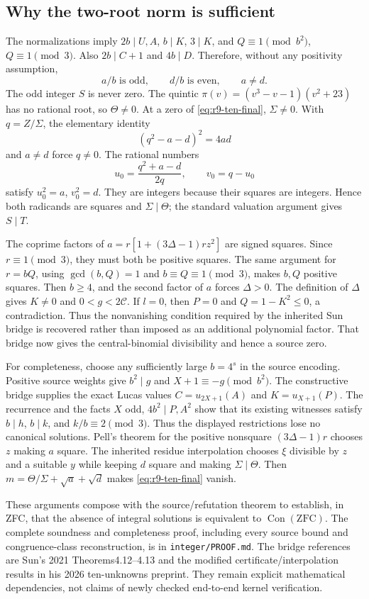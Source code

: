 \subsection{Why the two-root norm is sufficient}

The normalizations imply $2b\mid U,A$, $b\mid K$, $3\mid K$, and
$Q\equiv1\pmod{b^2}$, $Q\equiv1\pmod3$. Also $2b\mid C+1$ and
$4b\mid D$. Therefore, without any positivity assumption,
\[
 a/b\text{ is odd},\qquad d/b\text{ is even},\qquad a\ne d.
\]
The odd integer $S$ is never zero. The quintic
$\pi(v)=(v^3-v-1)(v^2+23)$ has no rational root, so $\Theta\ne0$.
At a zero of \eqref{eq:r9-ten-final}, $\Sigma\ne0$. With
$q=Z/\Sigma$, the elementary identity
\[
 (q^2-a-d)^2=4ad
\]
and $a\ne d$ force $q\ne0$. The rational numbers
\[
 u_0=\frac{q^2+a-d}{2q},\qquad v_0=q-u_0
\]
satisfy $u_0^2=a$, $v_0^2=d$. They are integers because their squares
are integers. Hence both radicands are squares and $\Sigma\mid\Theta$;
the standard valuation argument gives $S\mid T$.

The coprime factors of
$a=r[1+(3\Delta-1)rz^2]$ are signed squares. Since $r\equiv1\pmod3$,
they must both be positive squares. The same argument for $r=bQ$, using
$\gcd(b,Q)=1$ and $b\equiv Q\equiv1\pmod3$, makes $b,Q$ positive
squares. Then $b\ge4$, and the second factor of $a$ forces $\Delta>0$.
The definition of $\Delta$ gives $K\ne0$ and $0<g<2\mathcal C$.
If $l=0$, then $P=0$ and $Q=1-K^2\le0$, a contradiction. Thus the
nonvanishing condition required by the inherited Sun bridge is recovered
rather than imposed as an additional polynomial factor. That bridge now
gives the central-binomial divisibility and hence a source zero.

For completeness, choose any sufficiently large $b=4^s$ in the source
encoding. Positive source weights give $b^2\mid g$ and
$X+1\equiv-g\pmod{b^2}$. The constructive bridge supplies the exact
Lucas values $C=u_{2X+1}(A)$ and $K=u_{X+1}(P)$. The recurrence and the
facts $X$ odd, $4b^2\mid P,A^2$ show that its existing witnesses satisfy
$b\mid h$, $b\mid k$, and $k/b\equiv2\pmod3$. Thus the displayed
restrictions lose no canonical solutions. Pell's theorem for the positive
nonsquare $(3\Delta-1)r$ chooses $z$ making $a$ square. The inherited
residue interpolation chooses $\xi$ divisible by $z$ and a suitable $y$
while keeping $d$ square and making $\Sigma\mid\Theta$. Then
$m=\Theta/\Sigma+\sqrt a+\sqrt d$ makes \eqref{eq:r9-ten-final} vanish.

These arguments compose with the source/refutation theorem to establish,
in ZFC, that the absence of integral solutions is equivalent to
$\operatorname{Con}(\mathrm{ZFC})$. The complete soundness and completeness
proof, including every source bound and congruence-class reconstruction,
is in \texttt{integer/PROOF.md}. The bridge references are Sun's
2021 Theorems4.12--4.13 and the modified certificate/interpolation results
in his 2026 ten-unknowns preprint. They remain explicit mathematical
dependencies, not claims of newly checked end-to-end kernel verification.

